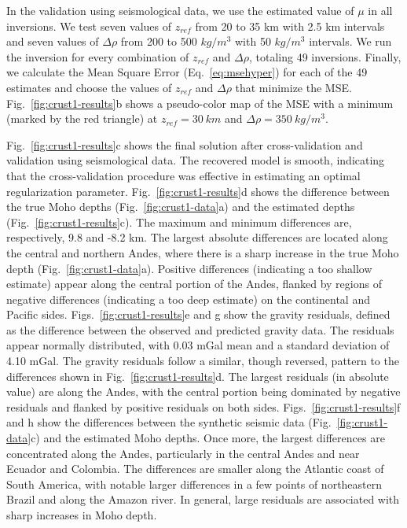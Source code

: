\documentclass[extra,mreferee]{gji}
\begin{document}
In the validation using seismological data,
we use the estimated value of $\mu$ in all inversions.
We test seven values of $z_{ref}$ from 20 to 35 km with 2.5 km intervals
and seven values of $\Delta\rho$ from 200 to 500 $kg/m^3$
with 50 $kg/m^3$ intervals.
We run the inversion for every combination of $z_{ref}$ and $\Delta\rho$,
totaling 49 inversions.
Finally, we calculate the Mean Square Error (Eq.~\ref{eq:msehyper})
for each of the 49 estimates
and choose the values of $z_{ref}$ and $\Delta\rho$ that minimize the MSE.
Fig.~\ref{fig:crust1-results}b
shows a pseudo-color map of the MSE
with a minimum (marked by the red triangle)
at $z_{ref} = 30\ km$ and $\Delta\rho = 350\ kg/m^3$.

Fig.~\ref{fig:crust1-results}c shows the final solution after
cross-validation and validation using seismological data.
The recovered model is smooth, indicating that the cross-validation procedure
was effective in estimating an optimal regularization parameter.
Fig.~\ref{fig:crust1-results}d shows the difference between
the true Moho depths (Fig.~\ref{fig:crust1-data}a)
and the estimated depths (Fig.~\ref{fig:crust1-results}c).
The maximum and minimum differences are, respectively,
9.8 and -8.2 km.
The largest absolute differences are located along the central and northern
Andes, where there is a sharp increase in the true Moho depth
(Fig.~\ref{fig:crust1-data}a).
Positive differences (indicating a too shallow estimate)
appear along the central portion of the Andes,
flanked by regions of negative differences (indicating a too deep estimate)
on the continental and Pacific sides.
Figs.~\ref{fig:crust1-results}e and g show the gravity residuals,
defined as the difference between the observed and predicted gravity data.
The residuals appear normally distributed,
with 0.03 mGal mean and a standard deviation of 4.10 mGal.
The gravity residuals follow a similar, though reversed, pattern
to the differences shown in Fig.~\ref{fig:crust1-results}d.
The largest residuals (in absolute value) are along the Andes,
with the central portion being dominated by negative residuals
and flanked by positive residuals on both sides.
Figs.~\ref{fig:crust1-results}f and h show the differences between
the synthetic seismic data (Fig.~\ref{fig:crust1-data}c)
and the estimated Moho depths.
Once more, the largest differences are concentrated along the Andes,
particularly in the central Andes and near Ecuador and Colombia.
The differences are smaller along the Atlantic coast of South America,
with notable larger differences in a few points of northeastern Brazil
and along the Amazon river.
In general, large residuals are associated with sharp increases in Moho depth.
\end{document}
